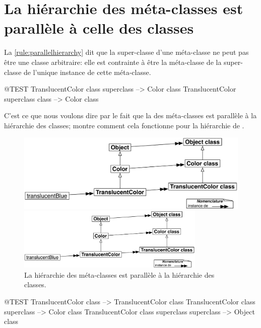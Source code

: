 \documentclass[a4paper,10pt,twoside]{book}
\begin{document}
\section{La hiérarchie des méta-classes est parallèle à celle des classes}

La \ref{rule:parallelhierarchy} dit que la super-classe d'une méta-classe ne peut pas être une classe arbitraire: elle est contrainte à être la méta-classe de la super-classe de l'unique instance de cette méta-classe.
\begin{code}{@TEST}
TranslucentColor class superclass --> Color class
TranslucentColor superclass class --> Color class
\end{code}

\noindent
C'est ce que nous voulons dire par le fait que la  des méta-classes est parallèle à la hiérarchie des classes;  montre comment cela fonctionne pour la hiérarchie de .
 
\begin{center}
\begin{figure}[!ht]
\ifluluelse
	{\centerline {\includegraphics[width=\textwidth]{TranslucentMetaclassHierarchy}}}
	{\centerline {\includegraphics[width=0.8\textwidth]{TranslucentMetaclassHierarchy}}}
\caption{La hiérarchie des méta-classes est parallèle à la hiérarchie des classes.\label{fig:parallelHierarchies}}
\end{figure}
\end{center}

\begin{code}{@TEST}
TranslucentColor class                                     --> TranslucentColor class
TranslucentColor class superclass                   --> Color class
TranslucentColor class superclass superclass --> Object class
\end{code}
\end{document}
